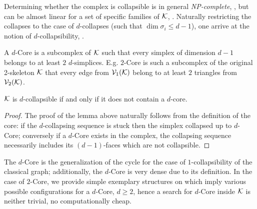 Determining whether the complex is collapsible is in general \emph{NP-complete}, \cite{tancer2016recognitiontancerRecognitionCollapsibleComplexes2016}, but can be almost linear for a set of specific families of \( \mathcal{K} \), \cite{cohenSolving1laplaciansNearly2014}. Naturally restricting the collapses to the case of \(d\)-collapses (such that \( \dim \sigma_i \le d-1 \)), one arrive at the notion of \(d\)-collapsibility, \cite{tancerDcollapsibilityNPcomplete2009}.

\begin{definition}[\(d\)-Core]
      A \(d\)-Core is a subcomplex of \( \mathcal{K} \) such that every simplex of dimension \( d - 1\) belongs to at least \( 2 \) \(d\)-simplices. E.g. \(2\)-Core is such a subcomplex of the original 2-skeleton \( \mathcal{K} \) that every edge from \( \mathcal{V}_{1}(\mathcal{K}) \) belong to at least \(2\) triangles from \( \mathcal{V}_{2}(\mathcal{K}) \).
\end{definition}
\begin{lemma}
      \( \mathcal{K} \) is \(d\)-collapsible if and only if it does not contain a \( d\)-core.
\end{lemma}
\begin{proof}
      The proof of the lemma above naturally follows from the definition of the core: if the \(d\)-collapsing sequence is stuck then the simplex collapsed up to \(d\)-Core; conversely if a \(d\)-Core exists in the complex, the collapsing sequence necessarily includes its \((d-1)\)-faces which are not collapsible.
\end{proof}
The \(d\)-Core is the generalization of the cycle for the case of \(1\)-collapsibility of the classical graph; additionally, the \(d\)-Core is very dense due to its definition. In the case of \(2\)-Core, we provide simple exemplary structures on  which imply various possible configurations for a  \(d\)-Core, \( d \ge 2 \), hence a search for \(d\)-Core inside \( \mathcal{K} \) is neither trivial, no computationally cheap.


